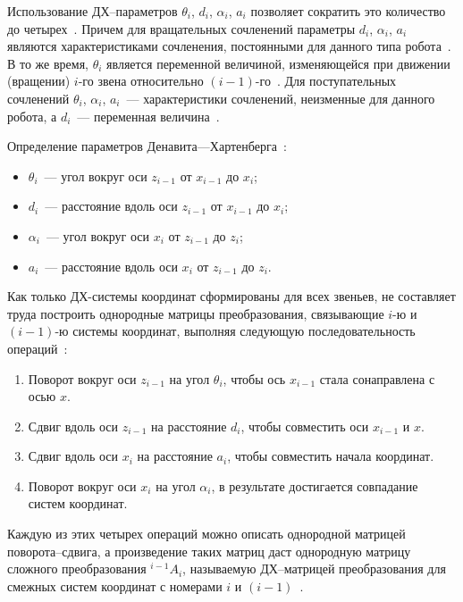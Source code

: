 \documentclass[oneside, final, 14pt]{extarticle}
\begin{document}
Использование ДХ--параметров \(\theta_i\), \(d_i\), \(\alpha_i\), \(a_i\) позволяет сократить это количество до четырех~\cite{borisov:mod_rob}.
Причем для вращательных сочленений параметры \(d_i\), \(\alpha_i\), \(a_i\) являются характеристиками сочленения, постоянными для данного типа робота~\cite{fu:rob_tech}.
В то же время, \(\theta_i\) является переменной величиной, изменяющейся при движении (вращении) \(i\)-го звена относительно \((i - 1)\)-го~\cite{fu:rob_tech}.
Для поступательных сочленений  \(\theta_i\), \(\alpha_i\), \(a_i\)~--- характеристики сочленений, неизменные для данного робота, а \(d_i\)~--- переменная величина~\cite{fu:rob_tech}.
\par
Определение параметров Денавита---Хартенберга~\cite{borisov:mod_rob}:
\begin{itemize}
  \item \(\theta_i\)~--- угол вокруг оси \(z_{i - 1}\) от \(x_{i - 1}\) до \(x_i\);
  \item \(d_i\)~--- расстояние вдоль оси \(z_{i - 1}\) от \(x_{i - 1}\) до \(x_i\);
  \item \(\alpha_i\)~--- угол вокруг оси \(x_i\) от \(z_{i - 1}\) до \(z_i\);
  \item \(a_i\)~--- расстояние вдоль оси \(x_i\) от \(z_{i - 1}\) до \(z_i\).
\end{itemize}
\par
Как только ДХ-системы координат сформированы для всех звеньев, не составляет труда построить однородные матрицы преобразования, связывающие \(i\)-ю и \((i-1)\)-ю системы координат, выполняя следующую последовательность операций~\cite{fu:rob_tech}:
\begin{enumerate}
  \item Поворот вокруг оси \(z_{i-1}\) на угол \(\theta_i\), чтобы ось \(x_{i-1}\) стала сонаправлена с осью \(x\).
  \item Сдвиг вдоль оси \(z_{i-1}\) на расстояние \(d_i\), чтобы совместить оси \(x_{i-1}\) и \(x\).
  \item Сдвиг вдоль оси \(x_i\) на расстояние \(a_i\), чтобы совместить начала координат.
  \item Поворот вокруг оси \(x_i\) на угол \(\alpha_i\), в результате достигается совпадание систем координат.
\end{enumerate}
\par
Каждую из этих четырех операций можно описать однородной матрицей поворота--сдвига, а произведение таких матриц даст однородную матрицу сложного преобразования \({}^{i-1}A_i\), называемую ДХ--матрицей преобразования для смежных систем координат с номерами \(i\) и \((i-1)\)~\cite{fu:rob_tech}.
\end{document}
